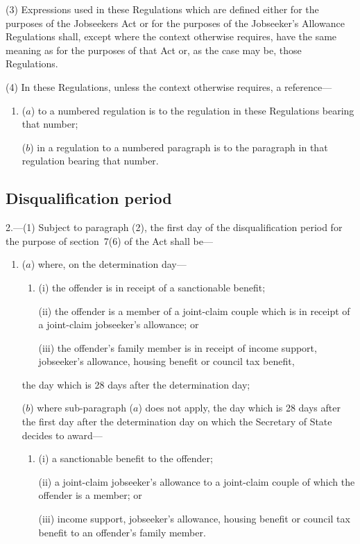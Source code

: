 \documentclass[12pt,a4paper]{article}
\begin{document}
(3) Expressions used in these Regulations which are defined either for the purposes of the Jobseekers Act or for the purposes of the Jobseeker’s Allowance Regulations shall, except where the context otherwise requires, have the same meaning as for the purposes of that Act or, as the case may be, those Regulations.

(4) In these Regulations, unless the context otherwise requires, a reference—
\begin{enumerate}\item[]
($a$) to a numbered regulation is to the regulation in these Regulations bearing that number;

($b$) in a regulation to a numbered paragraph is to the paragraph in that regulation bearing that number.
\end{enumerate}

\subsection[2. Disqualification period]{Disqualification period}

2.---(1)  Subject to paragraph (2), the first day of the disqualification period for the purpose of section~7(6) of the Act shall be—
\begin{enumerate}\item[]
($a$) where, on the determination day—
\begin{enumerate}\item[]
(i) the offender is in receipt of a sanctionable benefit;

(ii) the offender is a member of a joint-claim couple which is in receipt of a joint-claim jobseeker’s allowance; or

(iii) the offender’s family member is in receipt of income support, jobseeker’s allowance, housing benefit or council tax benefit,
\end{enumerate}
the day which is 28 days after the determination day;

($b$) where sub-paragraph ($a$)  does not apply, the day which is 28 days after the first day after the determination day on which the Secretary of State decides to award—
\begin{enumerate}\item[]
(i) a sanctionable benefit to the offender;

(ii) a joint-claim jobseeker’s allowance to a joint-claim couple of which the offender is a member; or

(iii) income support, jobseeker’s allowance, housing benefit or council tax benefit to an offender’s family member.
\end{enumerate}
\end{enumerate}
\end{document}
